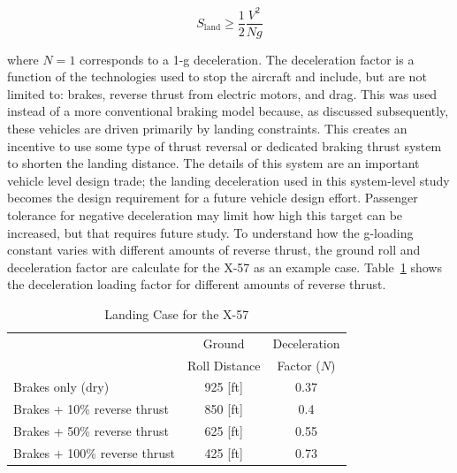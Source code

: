 \documentclass[]{aiaa-tc}%
\begin{document}
\begin{equation}
    \label{e:sgr}
    S_{\mathrm{land}} \geq \frac{1}{2} \frac{V^2}{Ng} 
\end{equation}

where $N=1$ corresponds to a 1-g deceleration. 
The deceleration factor is a function of the technologies used to stop the aircraft and include, but are not limited to: brakes, reverse thrust from electric motors, and drag.  This was used instead of a more conventional braking model because, as discussed subsequently, these vehicles are driven primarily by landing constraints.  This creates an incentive to use some type of thrust reversal or dedicated braking thrust system to shorten the landing distance.  The details of this system are an important vehicle level design trade; the landing deceleration used in this system-level study becomes the design requirement for a future vehicle design effort. Passenger tolerance for negative deceleration may limit how high this target can be increased, but that requires future study.  
To understand how the g-loading constant varies with different amounts of reverse thrust, the ground roll and deceleration factor are calculate for the X-57 as an example case. 
Table~\ref{t:landingdecel} shows the deceleration loading factor for different amounts of reverse thrust. 

\begin{table}[H]
    \centering
    \caption{Landing Case for the X-57}
    \label{t:landingdecel}
    \begin{tabular}{lcc}
    \toprule
    \toprule
                                    & Ground          & Deceleration \\ 
                                    & Roll Distance   & Factor ($N$)\\ \hline
    Brakes only (dry)               &  925 [ft]       & 0.37  \\
    Brakes + 10\% reverse thrust    &  850 [ft]       & 0.4   \\
    Brakes + 50\% reverse thrust    &  625 [ft]       & 0.55  \\
    Brakes + 100\% reverse thrust   &  425 [ft]       & 0.73  \\
    \bottomrule
\end{tabular}
\end{table}
\end{document}
